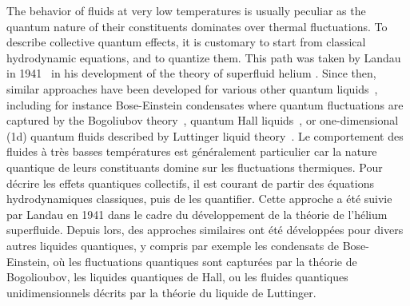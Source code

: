 \documentclass[twocolumn,amsfonts,showpacs,superscriptaddress]{revtex4-1}
\newcommand{\trad}[1]{\textcolor{myblue}{#1}}
\begin{document}
The behavior of fluids at very low temperatures is usually peculiar as the quantum nature of their constituents dominates over thermal fluctuations. To describe collective quantum effects, it is customary to start from classical hydrodynamic equations, and to quantize them. This path was taken by Landau in 1941~\cite{landau1941theory} in his development of the theory of superfluid helium \cite{khalatnikov2018introduction,putterman1974superfluid}. Since then, similar approaches have been developed for various other quantum liquids~\cite{nozieres2018theory,leggett2006quantum}, including for instance Bose-Einstein condensates where quantum fluctuations are captured by the Bogoliubov theory~\cite{bogolyubov1947theory,pitaevskii2016bose,mora2003extension}, quantum Hall liquids~\cite{wiegmann2013hydrodynamics,wiegmann2014anomalous,wiegmann2019quantization}, 
or one-dimensional (1d) quantum fluids described by Luttinger liquid theory~\cite{haldane1981luttinger,giamarchi2003quantum,cazalilla2004bosonizing}.
\trad{Le comportement des fluides à très basses températures est généralement particulier car la nature quantique de leurs constituants domine sur les fluctuations thermiques. Pour décrire les effets quantiques collectifs, il est courant de partir des équations hydrodynamiques classiques, puis de les quantifier. Cette approche a été suivie par Landau en 1941 dans le cadre du développement de la théorie de l'hélium superfluide. Depuis lors, des approches similaires ont été développées pour divers autres liquides quantiques, y compris par exemple les condensats de Bose-Einstein, où les fluctuations quantiques sont capturées par la théorie de Bogolioubov, les liquides quantiques de Hall, ou les fluides quantiques unidimensionnels décrits par la théorie du liquide de Luttinger.}
\end{document}
